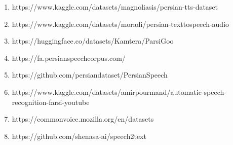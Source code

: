 \documentclass[fleqn]{report}
\begin{document}
\begin{enumerate}
    \item https://www.kaggle.com/datasets/magnoliasis/persian-tts-dataset
    \item https://www.kaggle.com/datasets/moradi/persian-texttospeech-audio
    \item https://huggingface.co/datasets/Kamtera/ParsiGoo
    \item https://fa.persianspeechcorpus.com/
    \item https://github.com/persiandataset/PersianSpeech
    \item https://www.kaggle.com/datasets/amirpourmand/automatic-speech-recognition-farsi-youtube
    \item https://commonvoice.mozilla.org/en/datasets
    \item https://github.com/shenasa-ai/speech2text
\end{enumerate}
\end{document}
